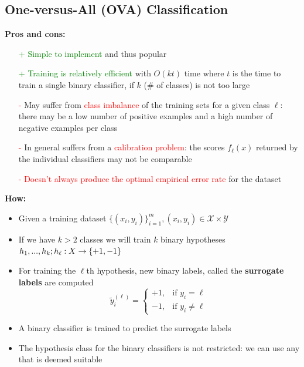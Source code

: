 \documentclass[12pt, a4paper]{article}
\begin{document}
\subsection{One-versus-All (OVA) Classification}\label{ova-classification}

\textbf{Pros and cons:}
\begin{itemize}
  \item[\textcolor{Green}{+}] \textcolor{Green}{Simple to implement} and thus popular
  \item[\textcolor{Green}{+}] \textcolor{Green}{Training is relatively efficient} with $O(kt)$ time where $t$ is the time to train a single binary classifier, if $k$ (\# of classes) is not too large
  \item[\textcolor{red}{-}] May suffer from \textcolor{red}{class imbalance} of the training sets for a given class $\ell$: there may be a low number of positive examples and a high number of negative examples per class
  \item[\textcolor{red}{-}] In general suffers from a \textcolor{red}{calibration problem}: the scores $f_{\ell}(x)$ returned by the individual classifiers may not be comparable
  \item[\textcolor{red}{-}] \textcolor{red}{Doesn't always produce the optimal empirical error rate} for the dataset
\end{itemize}


\textbf{How:}

\begin{itemize}
  \item Given a training dataset $\{(x_i,y_i)\}^m_{i=1},(x_i,y_i) \in \mathcal{X} \times \mathcal{Y}$
  \item If we have $k > 2$ classes we will train $k$ binary hypotheses $h_1, ..., h_k; \\ h_{\ell} : X \to \{+1,-1\}$
  \item For training the $\ell$th hypothesis, new binary labels, called the \textbf{surrogate labels} are computed
  $$
  \tilde{y}_i^{(\ell)} =
  \begin{cases}
	+1, & \text{if $y_i = \ell$} \\
  -1, & \text{if $y_i \neq \ell$}
	\end{cases}
  $$
  \item A binary classifier is trained to predict the surrogate labels
  \item The hypothesis class for the binary classifiers is not restricted: we can use any that is deemed suitable
\end{itemize}
\end{document}
